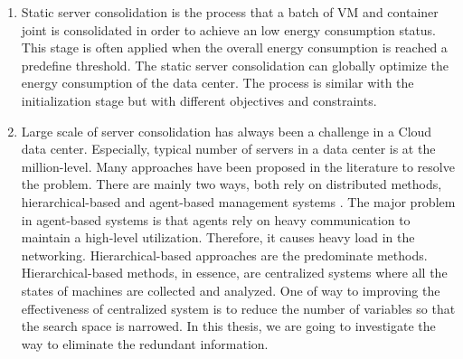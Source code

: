 \begin{enumerate}
	\item Static server consolidation is the process that a batch of VM and container joint is
	consolidated in order to achieve an low energy consumption status. This stage is often
	applied when the overall energy consumption is reached a predefine threshold. The static
	server consolidation can globally optimize the energy consumption of the data center.
	The process is similar with the initialization stage but with different objectives and constraints.

	\item Large scale of server consolidation has always been a challenge in a Cloud data center. 
	         Especially, typical number of servers in a data center is at the million-level. Many approaches 
	        have been proposed in the literature to resolve the problem. There are mainly two ways, both rely on distributed methods, hierarchical-based \cite{} and agent-based management systems \cite{}.
	        The major problem in agent-based systems is that agents rely on heavy communication to maintain a high-level utilization. Therefore, it causes heavy load in the networking. Hierarchical-based approaches are the predominate methods. Hierarchical-based methods, in essence, are centralized systems where all the states of machines are collected and analyzed. One of way to improving the effectiveness of centralized system is to reduce the number of variables so that the search space is narrowed. In this thesis, we are going to investigate the way to eliminate the redundant information.




\end{enumerate}
